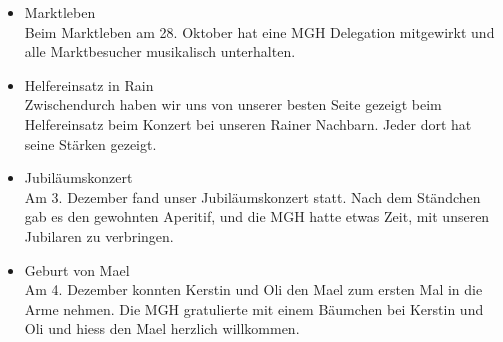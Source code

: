\begin{history}
\begin{itemize}
            \item  Marktleben\\
                  Beim Marktleben am 28. Oktober hat eine MGH Delegation
                  mitgewirkt und alle Marktbesucher musikalisch unterhalten.

            \item  Helfereinsatz in Rain\\
                  Zwischendurch haben wir uns von unserer besten Seite gezeigt
                  beim Helfereinsatz beim Konzert bei unseren Rainer Nachbarn.
                  Jeder dort hat seine Stärken gezeigt.

            \item Jubiläumskonzert\\
                  Am 3. Dezember fand unser Jubiläumskonzert statt. Nach dem
                  Ständchen gab es den gewohnten Aperitif, und die MGH hatte
                  etwas Zeit, mit unseren Jubilaren zu verbringen.

            \item Geburt von Mael\\
                  Am 4. Dezember konnten Kerstin und Oli den Mael zum ersten Mal
                  in die Arme nehmen. Die MGH gratulierte mit einem Bäumchen bei
                  Kerstin und Oli und hiess den Mael herzlich willkommen.
      \end{itemize}

\end{history}
